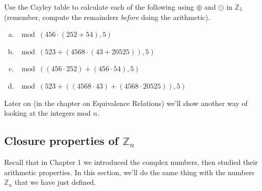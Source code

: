 \begin{exercise}{49}
Use the Cayley table to calculate each of the following using $\oplus$ and $\odot$ in ${\mathbb Z}_5$ (remember, compute the remainders \emph{before} doing the arithmetic).

\begin{enumerate}[(a)]
\item
$ \mod(456 \cdot (252 + 54),5) $
\item
$ \mod(523 + \left( 4568 \cdot (43 + 20525) \right),5)$
\item
$\mod((456 \cdot 252) + (456 \cdot 54),5) $
\item
$ \mod(523 + \left( (4568 \cdot 43) + (4568 \cdot 20525) \right) ,5)$
\end{enumerate}
\end{exercise}



\noindent
Later on (in the chapter on Equivalence Relations) we'll show another way of looking at the integers mod $n$.

\subsection{Closure properties of ${\mathbb Z}_n$}\label{sec:ClosureZn}

Recall that in Chapter 1 we introduced the complex numbers, then studied their arithmetic properties. In this section, we'll do the same thing with the numbers ${\mathbb Z}_n$ that we have just defined. 


